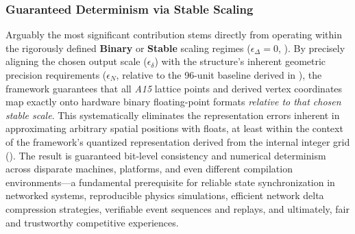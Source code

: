 \documentclass[10pt]{article}
\def\AAAB{\textit{A15}}
\begin{document}
\subsubsection{Guaranteed Determinism via Stable Scaling}\label{subsubsec-benefits-determinism}
Arguably the most significant contribution stems directly from operating within the rigorously defined \textbf{Binary} or \textbf{Stable} scaling regimes ($\epsilon_\Delta = 0$, ). By precisely aligning the chosen output scale ($\epsilon_\delta$) with the structure's inherent geometric precision requirements ($\epsilon_N$, relative to the 96-unit baseline derived in ), the framework guarantees that all \AAAB{} lattice points and derived vertex coordinates map exactly onto hardware binary floating-point formats \emph{relative to that chosen stable scale}. This systematically eliminates the representation errors inherent in approximating arbitrary spatial positions with floats, at least within the context of the framework's quantized representation derived from the internal integer grid (). The result is guaranteed bit-level consistency and numerical determinism across disparate machines, platforms, and even different compilation environments—a fundamental prerequisite for reliable state synchronization in networked systems, reproducible physics simulations, efficient network delta compression strategies, verifiable event sequences and replays, and ultimately, fair and trustworthy competitive experiences.
\end{document}
